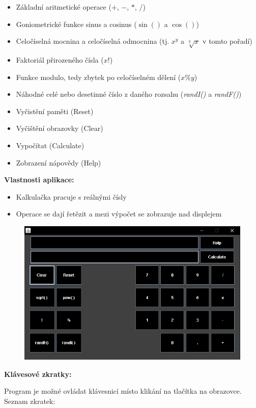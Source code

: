 \documentclass[a4paper, 11pt]{article}
\begin{document}
\begin{itemize}
    \item Základní aritmetické operace ($+$, $-$, $*$, $/$)
    \item Goniometrické funkce sinus a cosinus ($\sin()$ a $\cos()$)
    \item Celočíselná mocnina a celočíselná odmocnina (tj. $x^y$ a $\sqrt[y]{x}$ v tomto pořadí)
    \item Faktoriál přirozeného čísla ($x!$)
    \item Funkce modulo, tedy zbytek po celočíselném dělení ($x\%y$)
    \item Náhodné celé nebo desetinné číslo z daného rozsahu (\emph{randI()} a \emph{randF()})
    \item Vyčistění paměti (Reset)
    \item Vyčištění obrazovky (Clear)
    \item Vypočítat (Calculate)
    \item Zobrazení nápovědy (Help)
\end{itemize}

\noindent
\textbf{Vlastnosti aplikace:}

\begin{itemize}
    \item Kalkulačka pracuje s reálnými čísly
    \item Operace se dají řetězit a mezi výpočet se zobrazuje nad displejem
\end{itemize}

\begin{figure}[ht]
	\centering
	\includegraphics[width=.7\textwidth]{../screenshot.png}
\end{figure}

\noindent
\textbf{Klávesové zkratky:}

Program je možné ovládat klávesnicí místo klikání na tlačítka na obrazovce. Seznam zkratek:\\
\end{document}
